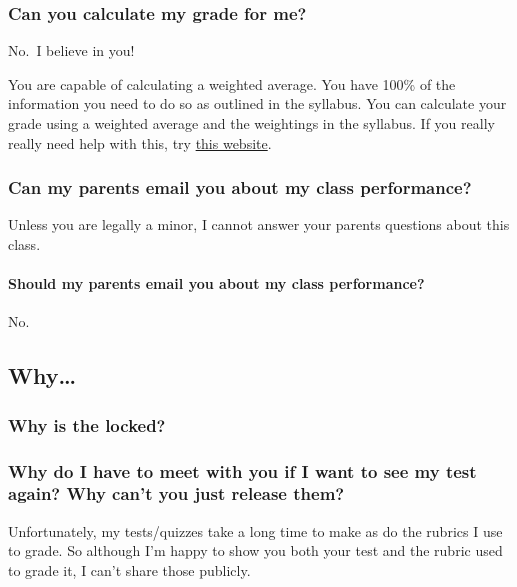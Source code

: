 \documentclass[
]{book}
\begin{document}
\subsubsection{Can you calculate my grade for me?}\label{can-you-calculate-my-grade-for-me-1}

No.~I believe in you!

You are capable of calculating a weighted average.
You have 100\% of the information you need to do so as outlined in the syllabus.
You can calculate your grade using a weighted average and the weightings in the syllabus.
If you really really need help with this, try \href{https://thegradecalculator.com/}{this website}.

\subsubsection{Can my parents email you about my class performance?}\label{can-my-parents-email-you-about-my-class-performance-1}

Unless you are legally a minor, I cannot answer your parents questions about this class.

\paragraph{Should my parents email you about my class performance?}\label{should-my-parents-email-you-about-my-class-performance}

No.

\subsection{Why\ldots{}}\label{why}

\subsubsection{\texorpdfstring{Why is the locked?}{Why is the  locked?}}\label{why-is-the-locked-1}

\subsubsection{Why do I have to meet with you if I want to see my test again? Why can't you just release them?}\label{why-do-i-have-to-meet-with-you-if-i-want-to-see-my-test-again-why-cant-you-just-release-them}

Unfortunately, my tests/quizzes take a long time to make as do the rubrics I use to grade. So although I'm happy to show you both your test and the rubric used to grade it, I can't share those publicly.
\end{document}
